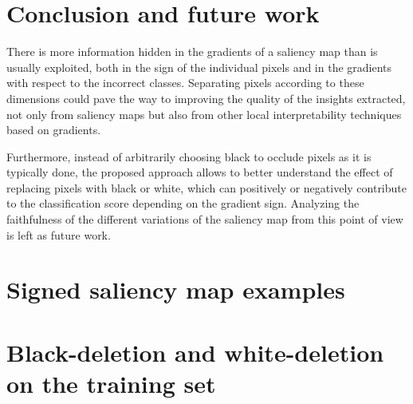 \documentclass[preprint,12pt]{elsarticle}
\begin{document}
\section{Conclusion and future work}
\label{sec:conclusions and future research}
There is more information hidden in the gradients of a saliency map than is usually exploited, both in the sign of the individual pixels and in the gradients with respect to the incorrect classes. Separating pixels according to these dimensions could pave the way to improving the quality of the insights extracted, not only from saliency maps but also from other local interpretability techniques based on gradients.

Furthermore, instead of arbitrarily choosing black to occlude pixels as it is typically done, the proposed approach allows to better understand the effect of replacing pixels with black or white, which can positively or negatively contribute to the classification score depending on the gradient sign. Analyzing the faithfulness of the different variations of the saliency map from this point of view is left as future work.


 
{\small}

\appendix

\section{Signed saliency map examples}
\label{sec:signed saliency map examples}

\section{Black-deletion and white-deletion on the training set}
\label{sec:black-deletion and white-deletion for training set}

  
  
\end{document}
